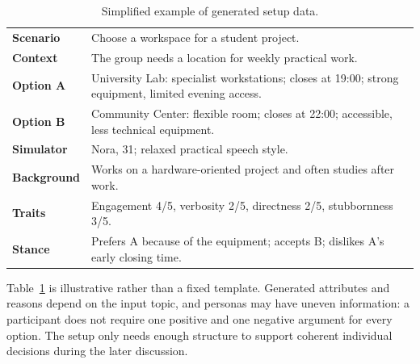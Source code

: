 \begin{table}[t]
\centering
\small
\caption{Simplified example of generated setup data.}
\label{tab:setup-example}
\begin{tabular}{@{}p{}p{}@{}}
\toprule
\textbf{Scenario} & Choose a workspace for a student project. \\
\textbf{Context} & The group needs a location for weekly practical work. \\
\textbf{Option A} & University Lab: specialist workstations; closes at 19:00; strong equipment, limited evening access. \\
\textbf{Option B} & Community Center: flexible room; closes at 22:00; accessible, less technical equipment. \\
\midrule
\textbf{Simulator} & Nora, 31; relaxed practical speech style. \\
\textbf{Background} & Works on a hardware-oriented project and often studies after work. \\
\textbf{Traits} & Engagement 4/5, verbosity 2/5, directness 2/5, stubbornness 3/5. \\
\textbf{Stance} & Prefers A because of the equipment; accepts B; dislikes A's early closing time. \\
\bottomrule
\end{tabular}
\end{table}

Table~\ref{tab:setup-example} is illustrative rather than a fixed template. Generated attributes and reasons depend on the input topic, and personas may have uneven information: a participant does not require one positive and one negative argument for every option. The setup only needs enough structure to support coherent individual decisions during the later discussion.
